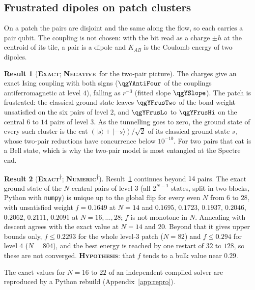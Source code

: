 \documentclass[11pt]{article}
\newcommand{\exact}{\textbf{\textsc{Exact}}}
\newcommand{\numeric}{\textbf{\textsc{Numeric}}}
\newcommand{\hypo}{\textbf{\textsc{Hypothesis}}}
\newcommand{\negres}{\textbf{\textsc{Negative}}}
\newcommand{\snap}{\textsuperscript{$\dagger$}}      %
\theoremstyle{definition}
\newtheorem{result}{Result}
\begin{document}
\subsection{Frustrated dipoles on patch clusters}\label{sec:ham-patch}
On a patch the pairs are disjoint and the same along the flow, so each carries a pair qubit. The coupling is not chosen: with the bit read as a charge $\pm h$ at the centroid of its tile, a pair is a dipole and $K_{AB}$ is the Coulomb energy of two dipoles.
\begin{result}[\exact; \negres\ for the two-pair picture]\label{res:ham-patch}
The charges give an exact Ising coupling with both signs ($\qgYAntiFour$ of the couplings antiferromagnetic at level $4$), falling as $r^{-3}$ (fitted slope $\qgYSlope$). The patch is frustrated: the classical ground state leaves $\qgYFrusTwo$ of the bond weight unsatisfied on the six pairs of level $2$, and $\qgYFrusLo$ to $\qgYFrusHi$ on the central $6$ to $14$ pairs of level $3$. As the tunnelling goes to zero, the ground state of every such cluster is the cat $(|s\rangle+|{-s}\rangle)/\sqrt2$ of its classical ground state $s$, whose two-pair reductions have concurrence below $10^{-10}$. For two pairs that cat is a Bell state, which is why the two-pair model is most entangled at the Spectre end.
\end{result}
\begin{result}[\exact\snap; \numeric\snap]\label{res:ham-dipole-large}
Result~\ref{res:ham-patch} continues beyond $14$ pairs. The exact ground state of the $N$ central pairs of level $3$ (all $2^{N-1}$ states, split in two blocks, Python with \texttt{numpy}) is unique up to the global flip for every even $N$ from $6$ to $28$, with unsatisfied weight $f=0.1649$ at $N=14$ and $0.1695$, $0.1723$, $0.1937$, $0.2046$, $0.2062$, $0.2111$, $0.2091$ at $N=16,\dots,28$; $f$ is not monotone in $N$. Annealing with descent agrees with the exact value at $N=14$ and $20$. Beyond that it gives upper bounds only, $f\le0.2293$ for the whole level-$3$ patch ($N=82$) and $f\le0.294$ for level $4$ ($N=804$), and the best energy is reached by one restart of $32$ to $128$, so these are not converged. \hypo: that $f$ tends to a bulk value near $0.29$.
\end{result}
The exact values for $N=16$ to $22$ of an independent compiled solver are reproduced by a Python rebuild (Appendix~\ref{app:repro}).
\end{document}
